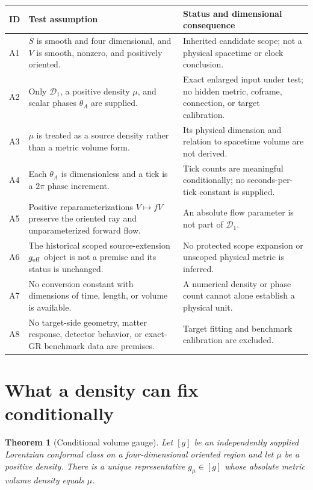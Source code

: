 \documentclass[11pt]{article}
\newtheorem{theorem}{Theorem}
\begin{document}
\begin{longtable}{>{\raggedright\arraybackslash}p{}
                  >{\raggedright\arraybackslash}p{}
                  >{\raggedright\arraybackslash}p{}}
\toprule
ID & Test assumption & Status and dimensional consequence\\
\midrule
\endhead
A1 & \(S\) is smooth and four dimensional, and \(V\) is smooth, nonzero, and
positively oriented. & Inherited candidate scope; not a physical spacetime or
clock conclusion.\\
A2 & Only \(\mathcal D_1\), a positive density \(\mu\), and scalar phases
\(\theta_A\) are supplied. & Exact enlarged input under test; no hidden
metric, coframe, connection, or target calibration.\\
A3 & \(\mu\) is treated as a source density rather than a metric volume form. &
Its physical dimension and relation to spacetime volume are not derived.\\
A4 & Each \(\theta_A\) is dimensionless and a tick is a \(2\pi\) phase
increment. & Tick counts are meaningful conditionally; no seconds-per-tick
constant is supplied.\\
A5 & Positive reparameterizations \(V\mapsto fV\) preserve the oriented ray and
unparameterized forward flow. & An absolute flow parameter is not part of
\(\mathcal D_1\).\\
A6 & The historical scoped source-extension \(g_{\rm eff}\) object is not a
premise and its status is unchanged. & No protected scope expansion or
unscoped physical metric is inferred.\\
A7 & No conversion constant with dimensions of time, length, or volume is
available. & A numerical density or phase count cannot alone establish a
physical unit.\\
A8 & No target-side geometry, matter response, detector behavior, or exact-GR
benchmark data are premises. & Target fitting and benchmark calibration are
excluded.\\
\bottomrule
\end{longtable}

\section{What a density can fix conditionally}

\begin{theorem}[Conditional volume gauge]
\label{thm:volume-gauge}
Let \([g]\) be an independently supplied Lorentzian conformal class on a
four-dimensional oriented region and let \(\mu\) be a positive density.
There is a unique representative \(g_\mu\in[g]\) whose absolute metric volume
density equals \(\mu\).
\end{theorem}
\end{document}

